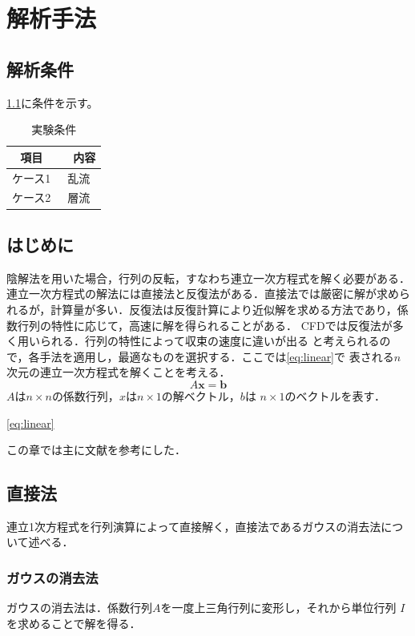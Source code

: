 \documentclass[./Main.tex]{subfiles}
\begin{document}
\chapter{解析手法}
\label{chap:simulation}

\section{解析条件}
\cref{tab:condition}に条件を示す。

\begin{table}[htbp]
    \centering
     \caption{実験条件}
    \begin{tabular}{cc}
    \hline
    項目     & 　内容 \\\hline
    ケース1     & 乱流 \\
    ケース2  &  層流 \\\hline
    \end{tabular}
       \label{tab:condition}
\end{table}

\section{はじめに}
陰解法を用いた場合，行列の反転，すなわち連立一次方程式を解く必要がある．
連立一次方程式の解法には直接法と反復法がある．直接法では厳密に解が求めら
れるが，計算量が多い．反復法は反復計算により近似解を求める方法であり，係
数行列の特性に応じて，高速に解を得られることがある．
CFDでは反復法が多く用いられる．行列の特性によって収束の速度に違いが出る
と考えられるので，各手法を適用し，最適なものを選択する．ここでは\cref{eq:linear}で
表される$n$次元の連立一次方程式を解くことを考える．
\begin{equation}
 A\bm{x}=\bm{b}
\label{eq:linear}
\end{equation}
$A$は$n\times n$の係数行列，$x$は$n\times1$の解ベクトル，$b$は
$n\times1$のベクトルを表す．

\cref{eq:linear}

この章では主に文献\cite{issa1986}を参考にした．

\section{直接法}
連立1次方程式を行列演算によって直接解く，直接法であるガウスの消去法につ
いて述べる．
\subsection{ガウスの消去法}
ガウスの消去法は．係数行列$A$を一度上三角行列に変形し，それから単位行列
$I$を求めることで解を得る．
\end{document}

